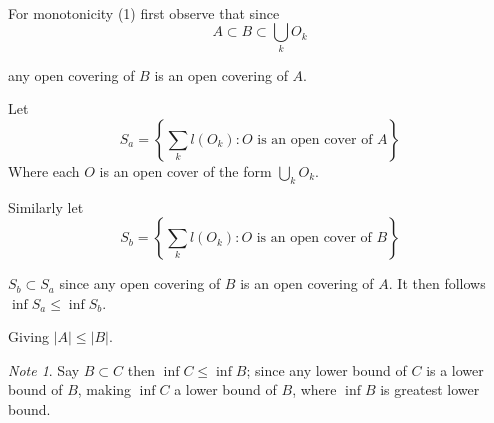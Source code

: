 \documentclass[12pt]{article}
\makeatletter
\theoremstyle{plain}
\theoremstyle{definition}
\theoremstyle{definition}
\theoremstyle{remark}
\newtheorem*{remark}{Note}
\renewenvironment{proof}[1][\proofname]{\par
\pushQED{\qed}\normalfont\topsep6\p@\@plus6\p@\relax
\trivlist\item[\hskip\labelsep\small\itshape #1\@addpunct{.}]\ignorespaces\mbox{}\\
}{\popQED\endtrivlist\@endpefalse}
\makeatother
\begin{document}
\begin{proof}[Proof: Monotonicity]
    For monotonicity (1) first observe that since 
    \begin{equation*}
        A \subset B \subset \bigcup_k O_k
    \end{equation*}

    any open covering of $B$ is an open covering of $A$.

    Let 
    \begin{equation*}
        S_a = \left\{ \sum_k l(O_k): O \text{ is an open cover of } A \right\}
    \end{equation*}
    Where each $O$ is an open cover of the form $\bigcup_k O_k$.

    Similarly let
    \begin{equation*}
        S_b = \left\{ \sum_k l(O_k): O \text{ is an open cover of } B \right\}
    \end{equation*}

    $S_b \subset S_a$ since any open covering of $B$ is an open covering of $A$.
    It then follows $\inf S_a \leq \inf S_b$.

    Giving $|A| \leq |B|$.

    \begin{remark}
        Say $B \subset C$ then $\inf C \leq \inf B$; since any lower bound of $C$ is
        a lower bound of $B$, making $\inf C$ a lower bound of $B$, where
        $\inf B$ is greatest lower bound.
    \end{remark}
\end{proof}
\end{document}
